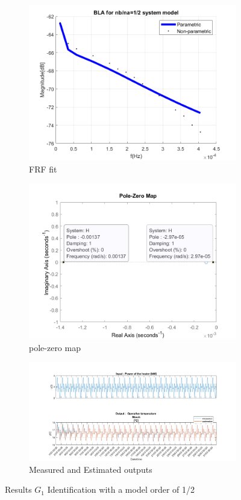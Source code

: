 \documentclass[a4paper,12pt]{article}
\numberwithin{equation}{section}
\begin{document}
\begin{figure}[H]
\centering
\begin{subfigure}{.5\textwidth}
  \centering
  \includegraphics[width=.7\linewidth]{G1mod12FrfFit.png}
  \caption{FRF fit}
  \label{fig:frf fit G1mod1/2}
\end{subfigure}%
\begin{subfigure}{.5\textwidth}
  \centering
  \includegraphics[width=.7\linewidth]{G1mod12pzmap.png}
  \caption{pole-zero map}
  \label{fig:pzmap G1mod1/2}
\end{subfigure}

\begin{subfigure}{\textwidth}
  \centering
  \includegraphics[scale=0.38]{G1mod12InOut.png}
  \caption{Measured and Estimated outputs}
  \label{fig:inoutG11/2}
\end{subfigure}
\caption{Results $G_{1}$ Identification with a model order of 1/2 }
\label{fig:G1mod1/2}
\end{figure}
\end{document}
